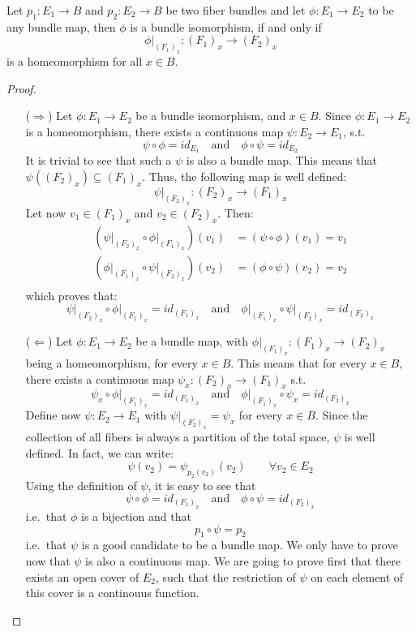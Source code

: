 \begin{proposition}
Let $p_1:E_1\to B$ and $p_2:E_2\to B$ be two fiber bundles and let $\phi:E_1\to E_2$ to be any bundle map, then $\phi$ is a bundle isomorphism, if and only if
\[\left.\phi\right|_{{(F_1)}_x}:{(F_1)}_x\to{(F_2)}_x\]
is a homeomorphism for all $x\in B$.
\end{proposition}
\begin{proof}
\begin{itemize}
\item[($\Rightarrow$)] Let $\phi:E_1\to E_2$ be a bundle isomorphism, and $x\in B$. Since $\phi:E_1\to E_2$ is a homeomorphism, there exists a continuous map $\psi:E_2\to E_1$, s.t.
\[\psi\circ\phi=id_{E_1}\quad\text{and}\quad\phi\circ\psi=id_{E_2}\]
It is trivial to see that such a $\psi$ is also a bundle map. This means that $\psi\left({(F_2)}_x\right)\subseteq{(F_1)}_x$. Thus, the following map is well defined:
\[\left.\psi\right|_{{(F_2)}_x}:{(F_2)}_x\to{(F_1)}_x\]
Let now $v_1\in{(F_1)}_x$ and $v_2\in{(F_2)}_x$. Then:
\begin{align*}
\left(\left.\psi\right|_{{(F_2)}_x}\circ\left.\phi\right|_{{(F_1)}_x}\right)(v_1)&=\left(\psi\circ\phi\right)(v_1)=v_1\\
\left(\left.\phi\right|_{{(F_1)}_x}\circ\left.\psi\right|_{{(F_2)}_x}\right)(v_2)&=\left(\phi\circ\psi\right)(v_2)=v_2\\
\end{align*}
which proves that:
\[\left.\psi\right|_{{(F_2)}_x}\circ\left.\phi\right|_{{(F_1)}_x}=id_{{(F_1)}_x}\quad\text{and}\quad\left.\phi\right|_{{(F_1)}_x}\circ\left.\psi\right|_{{(F_2)}_x}=id_{{(F_2)}_x}\]
\item[($\Leftarrow$)] Let $\phi:E_1\to E_2$ be a bundle map, with $\left.\phi\right|_{{(F_1)}_x}:{(F_1)}_x\to{(F_2)}_x$ being a homeomorphism, for every $x\in B$. This means that for every $x\in B$,  there exists a continuous map $\psi_x:{(F_2)}_x\to{(F_1)}_x$ s.t.
\[\psi_x\circ\left.\phi\right|_{{(F_1)}_x}=id_{{(F_1)}_x}\quad\text{and}\quad\left.\phi\right|_{{(F_1)}_x}\circ\psi_x=id_{{(F_2)}_x}\]
Define now $\psi:E_2\to E_1$ with $\left.\psi\right|_{{(F_2)}_x}=\psi_x$ for every $x\in B$. Since the collection of all fibers is always a partition of the total space, $\psi$ is well defined. In fact, we can write:
\[\psi(v_2)=\psi_{p_2(v_2)}(v_2)\qquad\forall v_2\in E_2\]
Using the definition of $\psi$, it is easy to see that
\[\psi\circ\phi=id_{{(F_1)}_x}\quad\text{and}\quad\phi\circ\psi=id_{{(F_2)}_x}\]
i.e.\ that $\phi$ is a bijection and that
\[p_1\circ\psi=p_2\]
i.e.\ that $\psi$ is a good candidate to be a bundle map. We only have to prove now that $\psi$ is also a continuous map. We are going to prove first that there exists an open cover of $E_2$, such that the restriction of $\psi$ on each element of this cover is a continouus function.


\end{itemize}
\end{proof}
